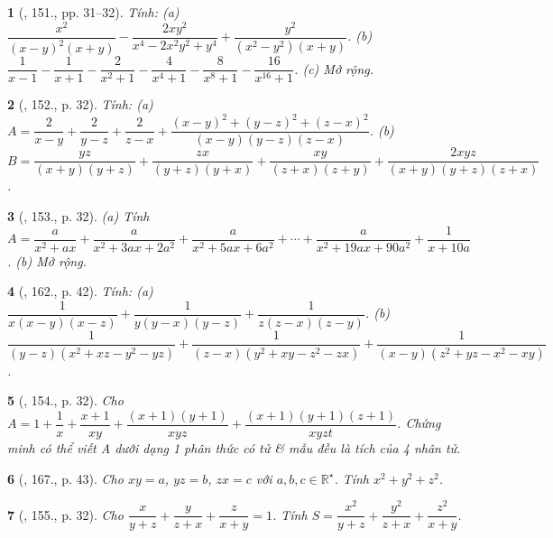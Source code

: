 \documentclass{article}
\newtheorem{baitoan}{}
\begin{document}
\begin{baitoan}[\cite{Tuyen_Toan_8}, 151., pp. 31--32]
	Tính: (a) $\dfrac{x^2}{(x - y)^2(x + y)} - \dfrac{2xy^2}{x^4 - 2x^2y^2 + y^4} + \dfrac{y^2}{(x^2 - y^2)(x + y)}$. (b) $\dfrac{1}{x - 1} - \dfrac{1}{x + 1} - \dfrac{2}{x^2 + 1} - \dfrac{4}{x^4 + 1} - \dfrac{8}{x^8 + 1} - \dfrac{16}{x^{16} + 1}$. (c) Mở rộng.
\end{baitoan}

\begin{baitoan}[\cite{Tuyen_Toan_8}, 152., p. 32]
	Tính: (a) $A = \dfrac{2}{x - y} + \dfrac{2}{y - z} + \dfrac{2}{z - x} + \dfrac{(x - y)^2 + (y - z)^2 + (z - x)^2}{(x - y)(y - z)(z - x)}$. (b) $B = \dfrac{yz}{(x + y)(y + z)} + \dfrac{zx}{(y + z)(y + x)} + \dfrac{xy}{(z + x)(z + y)} + \dfrac{2xyz}{(x + y)(y + z)(z + x)}$.
\end{baitoan}

\begin{baitoan}[\cite{Tuyen_Toan_8}, 153., p. 32]
	(a) Tính $A = \dfrac{a}{x^2 + ax} + \dfrac{a}{x^2 + 3ax + 2a^2} + \dfrac{a}{x^2 + 5ax + 6a^2} + \cdots + \dfrac{a}{x^2 + 19ax + 90a^2} + \dfrac{1}{x + 10a}$. (b) Mở rộng.
\end{baitoan}

\begin{baitoan}[\cite{Tuyen_Toan_8_old}, 162., p. 42]
	Tính: (a) $\dfrac{1}{x(x - y)(x - z)} + \dfrac{1}{y(y - x)(y - z)} + \dfrac{1}{z(z - x)(z - y)}$. (b) $\dfrac{1}{(y - z)(x^2 + xz - y^2 - yz)} + \dfrac{1}{(z - x)(y^2 + xy - z^2 - zx)} + \dfrac{1}{(x - y)(z^2 + yz - x^2 - xy)}$.
\end{baitoan}

\begin{baitoan}[\cite{Tuyen_Toan_8}, 154., p. 32]
	Cho $A = 1 + \dfrac{1}{x} + \dfrac{x + 1}{xy} + \dfrac{(x + 1)(y + 1)}{xyz} + \dfrac{(x + 1)(y + 1)(z + 1)}{xyzt}$. Chứng minh có thể viết A dưới dạng 1 phân thức có tử \& mẫu đều là tích của 4 nhân tử.
\end{baitoan}

\begin{baitoan}[\cite{Tuyen_Toan_8_old}, 167., p. 43]
	Cho $xy = a$, $yz = b$, $zx = c$ với $a,b,c\in\mathbb{R}^\star$. Tính $x^2 + y^2 + z^2$.
\end{baitoan}

\begin{baitoan}[\cite{Tuyen_Toan_8}, 155., p. 32]
	Cho $\dfrac{x}{y + z} + \dfrac{y}{z + x} + \dfrac{z}{x + y} = 1$. Tính $S = \dfrac{x^2}{y + z} + \dfrac{y^2}{z + x} + \dfrac{z^2}{x + y}$.
\end{baitoan}
\end{document}
